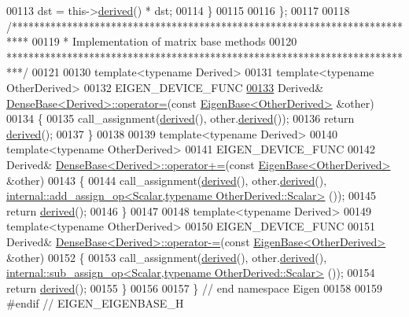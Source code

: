 \begin{DoxyCode}
00113     dst = this->\hyperlink{group___core___module_a324b16961a11d2ecfd2d1b7dd7946545}{derived}() * dst;
00114   \}
00115 
00116 \};
00117 
00118 \textcolor{comment}{/***************************************************************************}
00119 \textcolor{comment}{* Implementation of matrix base methods}
00120 \textcolor{comment}{***************************************************************************/}
00121 
00130 \textcolor{keyword}{template}<\textcolor{keyword}{typename} Derived>
00131 \textcolor{keyword}{template}<\textcolor{keyword}{typename} OtherDerived>
00132 EIGEN\_DEVICE\_FUNC
\hyperlink{group___core___module_a6462697d5a6fa3104f5f1213fdf9ff12}{00133} Derived& \hyperlink{group___core___module_a581a7a353bd007b5352f11688e3bc5fa}{DenseBase<Derived>::operator=}(\textcolor{keyword}{const} 
      \hyperlink{group___core___module_struct_eigen_1_1_eigen_base}{EigenBase<OtherDerived>} &other)
00134 \{
00135   call\_assignment(\hyperlink{group___core___module_a324b16961a11d2ecfd2d1b7dd7946545}{derived}(), other.\hyperlink{group___core___module_a324b16961a11d2ecfd2d1b7dd7946545}{derived}());
00136   \textcolor{keywordflow}{return} \hyperlink{group___core___module_a324b16961a11d2ecfd2d1b7dd7946545}{derived}();
00137 \}
00138 
00139 \textcolor{keyword}{template}<\textcolor{keyword}{typename} Derived>
00140 \textcolor{keyword}{template}<\textcolor{keyword}{typename} OtherDerived>
00141 EIGEN\_DEVICE\_FUNC
00142 Derived& \hyperlink{group___core___module_class_eigen_1_1_dense_base}{DenseBase<Derived>::operator+=}(\textcolor{keyword}{const} 
      \hyperlink{group___core___module_struct_eigen_1_1_eigen_base}{EigenBase<OtherDerived>} &other)
00143 \{
00144   call\_assignment(\hyperlink{group___core___module_a324b16961a11d2ecfd2d1b7dd7946545}{derived}(), other.\hyperlink{group___core___module_a324b16961a11d2ecfd2d1b7dd7946545}{derived}(), 
      \hyperlink{struct_eigen_1_1internal_1_1add__assign__op}{internal::add\_assign\_op<Scalar,typename OtherDerived::Scalar>}
      ());
00145   \textcolor{keywordflow}{return} \hyperlink{group___core___module_a324b16961a11d2ecfd2d1b7dd7946545}{derived}();
00146 \}
00147 
00148 \textcolor{keyword}{template}<\textcolor{keyword}{typename} Derived>
00149 \textcolor{keyword}{template}<\textcolor{keyword}{typename} OtherDerived>
00150 EIGEN\_DEVICE\_FUNC
00151 Derived& \hyperlink{group___core___module_class_eigen_1_1_dense_base}{DenseBase<Derived>::operator-=}(\textcolor{keyword}{const} 
      \hyperlink{group___core___module_struct_eigen_1_1_eigen_base}{EigenBase<OtherDerived>} &other)
00152 \{
00153   call\_assignment(\hyperlink{group___core___module_a324b16961a11d2ecfd2d1b7dd7946545}{derived}(), other.\hyperlink{group___core___module_a324b16961a11d2ecfd2d1b7dd7946545}{derived}(), 
      \hyperlink{struct_eigen_1_1internal_1_1sub__assign__op}{internal::sub\_assign\_op<Scalar,typename OtherDerived::Scalar>}
      ());
00154   \textcolor{keywordflow}{return} \hyperlink{group___core___module_a324b16961a11d2ecfd2d1b7dd7946545}{derived}();
00155 \}
00156 
00157 \} \textcolor{comment}{// end namespace Eigen}
00158 
00159 \textcolor{preprocessor}{#endif // EIGEN\_EIGENBASE\_H}
\end{DoxyCode}
